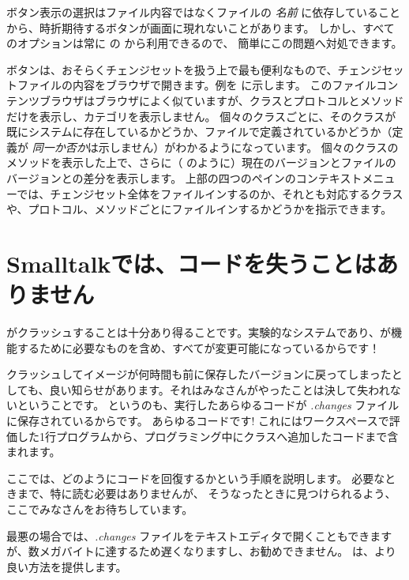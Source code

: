 \documentclass[a4paper,10pt,twoside]{book}
\begin{document}
ボタン表示の選択はファイル内容ではなくファイルの \emph{名前} に依存していることから、時折期待するボタンが画面に現れないことがあります。
しかし、すべてのオプションは常に \actclick の  から利用できるので、
簡単にこの問題へ対処できます。

 ボタンは、おそらくチェンジセットを扱う上で最も便利なもので、チェンジセットファイルの内容をブラウザで開きます。例を  に示します。
このファイルコンテンツブラウザはブラウザによく似ていますが、クラスとプロトコルとメソッドだけを表示し、カテゴリを表示しません。
個々のクラスごとに、そのクラスが既にシステムに存在しているかどうか、ファイルで定義されているかどうか（定義が \emph{同一か否か}は示しません）がわかるようになっています。
個々のクラスのメソッドを表示した上で、さらに（ のように）現在のバージョンとファイルのバージョンとの差分を表示します。
上部の四つのペインのコンテキストメニューでは、チェンジセット全体をファイルインするのか、それとも対応するクラスや、プロトコル、メソッドごとにファイルインするかどうかを指示できます。

\section{Smalltalkでは、コードを失うことはありません}

\pharo がクラッシュすることは十分あり得ることです。実験的なシステムであり、\pharo が機能するために必要なものを含め、すべてが変更可能になっているからです！


クラッシュしてイメージが何時間も前に保存したバージョンに戻ってしまったとしても、良い知らせがあります。それはみなさんがやったことは決して失われないということです。
というのも、実行したあらゆるコードが \emph{.changes} ファイルに保存されているからです。
あらゆるコードです!
これにはワークスペースで評価した1行プログラムから、プログラミング中にクラスへ追加したコードまで含まれます。

ここでは、どのようにコードを回復するかという手順を説明します。
必要なときまで、特に読む必要はありませんが、
そうなったときに見つけられるよう、ここでみなさんをお待ちしています。

最悪の場合では、\emph{.changes} ファイルをテキストエディタで開くこともできますが、数メガバイトに達するため遅くなりますし、お勧めできません。
\pharo は、より良い方法を提供します。
\end{document}
